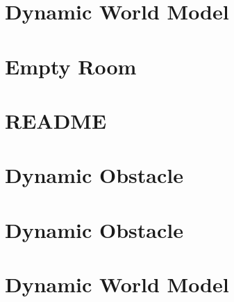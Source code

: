 \documentclass[twoside]{book}
\newcommand{\+}{\discretionary{\mbox{\scriptsize$\hookleftarrow$}}{}{}}
\begin{document}
\chapter{Dynamic World Model}
\label{md_smacc2_sm_reference_library_sm_dance_bot_strikes_back_models_dynamic_world_README}

\chapter{Empty Room}
\label{md_smacc2_sm_reference_library_sm_dance_bot_strikes_back_models_empty_room_README}

\chapter{README}
\label{md_smacc2_sm_reference_library_sm_dance_bot_strikes_back_README}

\chapter{Dynamic Obstacle}
\label{md_smacc2_sm_reference_library_sm_dance_bot_warehouse_models_dynamic_obstacle_copy_README}

\chapter{Dynamic Obstacle}
\label{md_smacc2_sm_reference_library_sm_dance_bot_warehouse_models_dynamic_obstacle_README}

\chapter{Dynamic World Model}
\label{md_smacc2_sm_reference_library_sm_dance_bot_warehouse_models_dynamic_world_copy_README}

\end{document}
